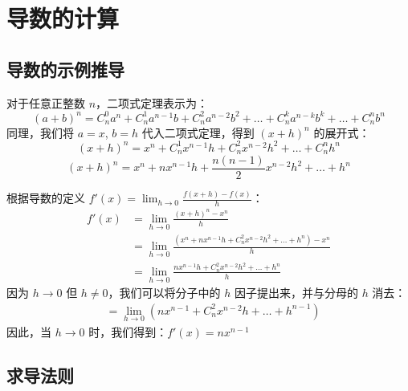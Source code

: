 \section{导数的计算}

\subsection{导数的示例推导}

\begin{theorem}[二项式定理展开]
    对于任意正整数 $n$，二项式定理表示为：
    $$(a+b)^n = C_n^0 a^n + C_n^1 a^{n-1}b + C_n^2 a^{n-2}b^2 + \dots + C_n^k a^{n-k}b^k + \dots + C_n^n b^n$$
    同理，我们将 $a=x$, $b=h$ 代入二项式定理，得到 $(x+h)^n$ 的展开式：
    $$(x+h)^n = x^n + C_n^1 x^{n-1}h + C_n^2 x^{n-2}h^2 + \dots + C_n^n h^n$$
    $$(x+h)^n = x^n + nx^{n-1}h + \frac{n(n-1)}{2}x^{n-2}h^2 + \dots + h^n$$
\end{theorem}

\begin{solution}
    根据导数的定义 $f'(x) = \lim_{h \to 0} \frac{f(x + h) - f(x)}{h}$：
    \begin{align*}
        f'(x) & = \lim_{h \to 0} \frac{(x + h)^n - x^n}{h}                                                       \\
              & = \lim_{h \to 0} \frac{\left( x^n + nx^{n-1}h + C_n^2 x^{n-2}h^2 + \dots + h^n \right) - x^n}{h} \\
              & = \lim_{h \to 0} \frac{nx^{n-1}h + C_n^2 x^{n-2}h^2 + \dots + h^n}{h}
    \end{align*}
    因为 $h \to 0$ 但 $h \ne 0$，我们可以将分子中的 $h$ 因子提出来，并与分母的 $h$ 消去：
    \begin{align*}
         & = \lim_{h \to 0} \left( nx^{n-1} + C_n^2 x^{n-2}h + \dots + h^{n-1} \right)
    \end{align*}
    因此，当 $h \to 0$ 时，我们得到：$f'(x) = nx^{n-1}$
\end{solution}

\subsection{求导法则}

